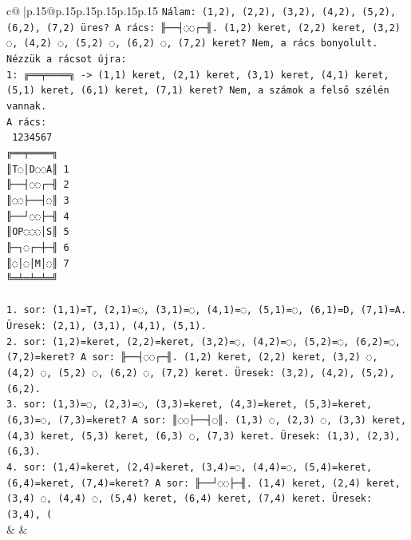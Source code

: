 \documentclass{article}
\begin{document}
{\begin{supertabular}{c@{$\;$}|p{.15\linewidth}@{}p{.15\linewidth}p{.15\linewidth}p{.15\linewidth}p{.15\linewidth}p{.15\linewidth}}
{{{\texttt{Nálam: (1,2), (2,2), (3,2), (4,2), (5,2), (6,2), (7,2) üres? A rács: ╟──┤◌◌┌─╢. (1,2) keret, (2,2) keret, (3,2) ◌, (4,2) ◌, (5,2) ◌, (6,2) ◌, (7,2) keret? Nem, a rács bonyolult.} \\
\texttt{Nézzük a rácsot újra:} \\
\texttt{1: ╔══╤════╗ {-}> (1,1) keret, (2,1) keret, (3,1) keret, (4,1) keret, (5,1) keret, (6,1) keret, (7,1) keret? Nem, a számok a felső szélén vannak.} \\
\texttt{A rács:} \\
\texttt{ 1234567} \\
\texttt{╔══╤════╗} \\
\texttt{║T◌│D◌◌A║ 1} \\
\texttt{╟──┤◌◌┌─╢ 2} \\
\texttt{║◌◌├──┤◌║ 3} \\
\texttt{╟──┘◌◌├─╢ 4} \\
\texttt{║OP◌◌◌│S║ 5} \\
\texttt{╟─┐◌┌─┼─╢ 6} \\
\texttt{║◌│◌│M│◌║ 7} \\
\texttt{╚═╧═╧═╧═╝} \\
\\ 
\texttt{1. sor: (1,1)=T, (2,1)=◌, (3,1)=◌, (4,1)=◌, (5,1)=◌, (6,1)=D, (7,1)=A. Üresek: (2,1), (3,1), (4,1), (5,1).} \\
\texttt{2. sor: (1,2)=keret, (2,2)=keret, (3,2)=◌, (4,2)=◌, (5,2)=◌, (6,2)=◌, (7,2)=keret? A sor: ╟──┤◌◌┌─╢. (1,2) keret, (2,2) keret, (3,2) ◌, (4,2) ◌, (5,2) ◌, (6,2) ◌, (7,2) keret. Üresek: (3,2), (4,2), (5,2), (6,2).} \\
\texttt{3. sor: (1,3)=◌, (2,3)=◌, (3,3)=keret, (4,3)=keret, (5,3)=keret, (6,3)=◌, (7,3)=keret? A sor: ║◌◌├──┤◌║. (1,3) ◌, (2,3) ◌, (3,3) keret, (4,3) keret, (5,3) keret, (6,3) ◌, (7,3) keret. Üresek: (1,3), (2,3), (6,3).} \\
\texttt{4. sor: (1,4)=keret, (2,4)=keret, (3,4)=◌, (4,4)=◌, (5,4)=keret, (6,4)=keret, (7,4)=keret? A sor: ╟──┘◌◌├─╢. (1,4) keret, (2,4) keret, (3,4) ◌, (4,4) ◌, (5,4) keret, (6,4) keret, (7,4) keret. Üresek: (3,4), (} \\
            }
        }
    }
    & & \\ \\


\end{supertabular}}
\end{document}

